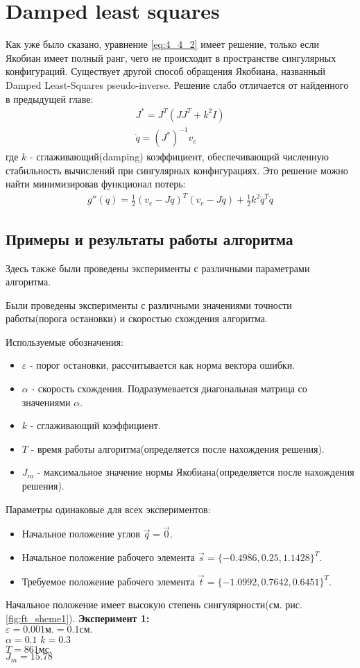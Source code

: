 \section{Damped least squares} \label{sect:4_5}
Как уже было сказано, уравнение \ref{eq:4_4_2} имеет решение, только если Якобиан имеет полный ранг, чего не происходит в пространстве сингулярных конфигураций. Существует другой способ обращения Якобиана, названный Damped Least-Squares pseudo-inverse. Решение слабо отличается от найденного в предыдущей главе:
\begin{align}
	J^{*} = J^{T}(JJ^{T} + k^{2}I)\\
	\dot{q} = (J^{*})^{-1}v_{e}
\end{align}
где $k$ - сглаживающий(damping) коэффициент, обеспечивающий численную стабильность вычислений при сингулярных конфигурациях. Это решение можно найти минимизировав функционал потерь\cite{Bruno}:
\begin{align}
	g''(\dot{q}) = \frac{1}{2}(v_{e} - J\dot{q})^{T}(v_{e} - J\dot{q}) + \frac{1}{2}k^{2}\dot{q}^{T}\dot{q}
\end{align}

\subsection{Примеры и результаты работы алгоритма}\label{subsect:4_5_1}
Здесь также были проведены эксперименты с различными параметрами алгоритма.

	Были проведены эксперименты с различными значениями точности работы(порога остановки) и скоростью схождения алгоритма.

Используемые обозначения:
\begin{itemize}
	\item $\varepsilon$ - порог остановки, рассчитывается как норма вектора ошибки.
	\item $\alpha$ - скорость схождения. Подразумевается диагональная матрица со значениями $\alpha$.
	\item $k$ - сглаживающий коэффициент.
	\item $T$ - время работы алгоритма(определяется после нахождения решения).
	\item $J_{m}$ - максимальное значение нормы Якобиана(определяется после нахождения решения).
\end{itemize}
\bigbreak
Параметры одинаковые для всех экспериментов:
\begin{itemize}
	\item 	Начальное положение углов $\vec{q} = \vec{0}$.
	\item	Начальное положение рабочего элемента $\vec{s} = \{-0.4986, 0.25, 1.1428\}^{T}$.
	\item	Требуемое положение рабочего элемента $\vec{t} = \{-1.0992, 0.7642, 0.6451\}^{T}$.
\end{itemize}
\bigbreak
Начальное положение имеет высокую степень сингулярности(см. рис. \ref{fig:ft_sheme1}). 
\bigbreak
\textbf{Эксперимент 1:}\\
$\varepsilon = 0.001\text{м.} = 0.1\text{см.}$\\
$\alpha = 0.1$
$k = 0.3$\\
$T = 861 \text{мс.}$\\
$J_{m} = 15.78$

